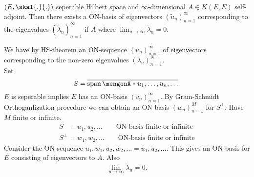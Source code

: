 \begin{theorem}
	$(E,\skal{.}{.})$ seperable Hilbert space and $\infty$-dimensional $A \in K(E,E)$ self-adjoint. Then there exists a ON-basis of eigenvectors $(\tilde u_n)_{n=1}^{\infty}$ corresponding to the eigenvalues $(\tilde \lambda_n)_{n=1}^{\infty}$ if $A$ where $\lim_{n \to \infty} \tilde \lambda_n = 0$.
\end{theorem}
\begin{beweis}
	We have by HS-theorem an ON-sequence $(u_n)_{n=1}^{\infty}$ of eigenvectors corresponding to the non-zero eigenvalues $(\lambda_n)_{n=1}^{N}$. \\
	Set
	\[
		S = \overline{\spn\set{u_1,\dots,u_n, \dots}}.
	\]
	$E$ is seperable implies $E$ has an ON-basis $(v_n)_{n=1}^{\infty}$. By Gram-Schmidt Orthoganlization procedure we can obtain an ON-basis $(w_n)_{n=1}^{M}$ for $S^{\perp}$. Have $M$ finite or infinite. \begin{align*}
		S &:\,u_1,u_2, \dots \qquad \text{ON-basis finite or infinite} \\
		S^{\perp} &:\,w_1,w_2, \dots \qquad \text{ON-basis finite or infinite}
	\end{align*}
	Consider the ON-sequence $u_1,w_1,u_2,w_2, \dots = \tilde u_1, \tilde u_2, \dots$. This gives an ON-basis for $E$ consisting of eigenvectors to $A$. Also
	\[
		\lim_{n \to \infty}\tilde \lambda_n = 0.
	\]
\end{beweis}
